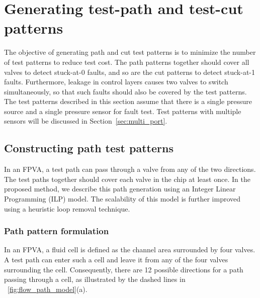 
\section{Generating test-path and test-cut patterns} 
\label{sec:path_cut}

The objective of generating path and cut test patterns is
to minimize the number of test patterns to reduce test cost. The path patterns
together should cover all valves to detect stuck-at-0 faults, and so  
are the cut patterns to detect stuck-at-1 faults. Furthermore, leakage in
control layers causes two valves to switch simultaneously, so that such faults
should also be covered by the test patterns. The test patterns described in
this section assume that there is a single pressure source and a single
pressure sensor for fault test. Test patterns with multiple sensors will be discussed in
Section~\ref{sec:multi_port}.


\subsection{Constructing path test patterns} 
\label{sec:flow_paths}

In an FPVA, a test path can pass through a valve from any of the two
directions.  
The test paths together should cover each valve in the chip at least once.
In the proposed method, we describe this path generation using an Integer Linear
Programming (ILP) model.  The scalability of this model is further improved
using a heuristic loop removal technique. 

\subsubsection{Path pattern formulation} \label{sec:flow_path_cons}

In an FPVA, a fluid cell is defined as the channel area surrounded by four
valves. A test path can enter such a   
cell and leave it from any of the four valves surrounding the cell.
Consequently,  
there are 12 possible directions for a path passing through a cell, 
as illustrated by the dashed lines in \figname~\ref{fig:flow_path_model}(a).


